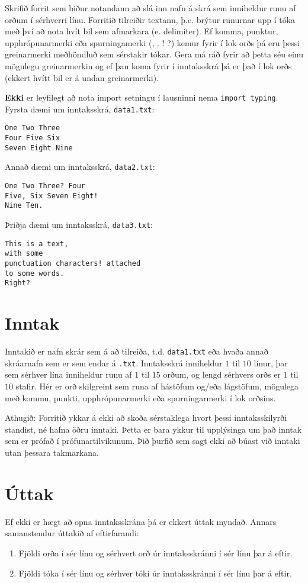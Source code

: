 
Skrifið forrit sem biður notandann að slá inn nafn á skrá sem inniheldur runu af orðum í sérhverri línu.
Forritið tilreiðir textann, þ.e. brýtur runurnar upp í tóka með því að nota hvít bil sem afmarkara (e. delimiter).
Ef komma, punktur, upphrópunarmerki eða spurningamerki (, . ! ?) kemur fyrir í lok orðs þá eru þessi greinarmerki meðhöndluð sem sérstakir tókar.
Gera má ráð fyrir að þetta séu einu mögulegu greinarmerkin og ef þau koma fyrir í inntaksskrá þá er það í lok orðs (ekkert hvítt bil er á undan greinarmerki).

\textbf{Ekki} er leyfilegt að nota import setningu í lausninni nema \texttt{import typing}. \\

Fyrsta dæmi um inntaksskrá, \texttt{data1.txt}:
\begin{verbatim}
One Two Three
Four Five Six
Seven Eight Nine
\end{verbatim}

Annað dæmi um inntaksskrá, \texttt{data2.txt}:
\begin{verbatim}
One Two Three? Four
Five, Six Seven Eight!
Nine Ten.
\end{verbatim}

Þriðja dæmi um inntaksskrá, \texttt{data3.txt}:
\begin{verbatim}
This is a text, 
with some
punctuation characters! attached 
to some words. 
Right?
\end{verbatim}


\section*{Inntak}
Inntakið er nafn skrár sem á að tilreiða, t.d. \texttt{data1.txt} eða hvaða annað skráarnafn sem er sem endar á \texttt{.txt}.
Inntaksskrá inniheldur $1$ til $10$ línur, þar sem sérhver lína inniheldur runu af $1$ til $15$ orðum, og lengd sérhvers orðs er $1$ til $10$ stafir.
Hér er orð skilgreint sem runa af hástöfum og/eða lágstöfum, mögulega með kommu, punkti, upphrópunarmerki eða spurningarmerki í lok orðsins.

Athugið: Forritið ykkar á ekki að skoða sérstaklega hvort þessi inntaksskilyrði standist, né hafna öðru inntaki. 
Þetta er bara ykkur til upplýsinga um það inntak sem er prófað í prófunartilvikunum. 
Þið þurfið sem sagt ekki að búast við inntaki utan þessara takmarkana.

\section*{Úttak}
Ef ekki er hægt að opna inntaksskrána þá er ekkert úttak myndað.
Annars samanstendur úttakið af eftirfarandi:
\begin{enumerate}
    \item Fjöldi orða í sér línu og sérhvert orð úr inntaksskránni í sér línu þar á eftir.
    \item Fjöldi tóka í sér línu og sérhver tóki úr inntaksskránni í sér línu þar á eftir. 
\end{enumerate}
